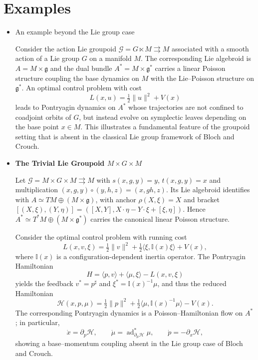 \documentclass{article}
\begin{document}
\section{Examples}
\begin{itemize}

\item {An example beyond the Lie group case}

Consider the action Lie groupoid $\mathcal G = G \ltimes M \rightrightarrows M$
associated with a smooth action of a Lie group $G$ on a manifold $M$.
The corresponding Lie algebroid is $A=M\times\mathfrak g$ and the dual bundle
$A^*=M\times\mathfrak g^*$ carries a linear Poisson structure coupling the base
dynamics on $M$ with the Lie--Poisson structure on $\mathfrak g^*$.
An optimal control problem with cost
\[
L(x,u)=\tfrac12\|u\|^2+V(x)
\]
leads to Pontryagin dynamics on $A^*$ whose trajectories are not confined to
coadjoint orbits of $G$, but instead evolve on symplectic leaves depending on
the base point $x\in M$.
This illustrates a fundamental feature of the groupoid setting that is absent
in the classical Lie group framework of Bloch and Crouch.
\item{{\bf The Trivial Lie Groupoid $M\times G\times M$}}

Let $\mathcal G = M\times G\times M \rightrightarrows M$ with
$s(x,g,y)=y$, $t(x,g,y)=x$ and multiplication $(x,g,y)\circ(y,h,z)=(x,gh,z)$.
Its Lie algebroid identifies with $A\simeq TM\oplus (M\times\mathfrak g)$,
with anchor $\rho(X,\xi)=X$ and bracket
$[(X,\xi),(Y,\eta)]=([X,Y],X\cdot\eta-Y\cdot\xi+[\xi,\eta])$.
Hence $A^*\simeq T^*M\oplus (M\times\mathfrak g^*)$ carries the canonical linear Poisson structure.

Consider the optimal control problem with running cost
\[
L(x,v,\xi)=\tfrac12\|v\|^2+\tfrac12\langle \xi,\mathbb I(x)\xi\rangle+V(x),
\]
where $\mathbb I(x)$ is a configuration-dependent inertia operator.
The Pontryagin Hamiltonian
\[
H=\langle p,v\rangle+\langle \mu,\xi\rangle - L(x,v,\xi)
\]
yields the feedback $v^*=p^\sharp$ and $\xi^*=\mathbb I(x)^{-1}\mu$, and thus the reduced Hamiltonian
\[
\mathcal H(x,p,\mu)=\tfrac12\|p\|^2+\tfrac12\langle \mu,\mathbb I(x)^{-1}\mu\rangle - V(x).
\]
The corresponding Pontryagin dynamics is a Poisson--Hamiltonian flow on $A^*$; in particular,
\[
\dot x=\partial_p\mathcal H,\qquad 
\dot\mu=\operatorname{ad}^*_{\partial_\mu\mathcal H}\mu,
\qquad
\dot p=-\partial_x\mathcal H,
\]
showing a base--momentum coupling absent in the Lie group case of Bloch and Crouch.


\end{itemize}
\end{document}
